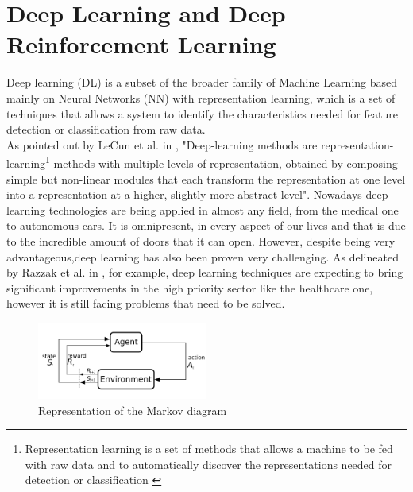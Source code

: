 \documentclass[conference]{IEEEtran}
\begin{document}
\section{Deep Learning and Deep Reinforcement Learning}\label{Deep_learning_DRL}
Deep learning (DL) is a subset of the broader family of Machine Learning based mainly on Neural Networks (NN)  with representation learning, which is a set of techniques that allows a system to identify the characteristics needed for feature detection or classification from raw data. \\
As pointed out by LeCun et al. in \cite{deep_learning}, "Deep-learning methods are representation-learning\footnote{Representation learning is a set of methods that allows a machine to be fed with raw data and to automatically discover the representations needed for detection or classification \cite{deep_learning}} methods with multiple levels of representation, obtained by composing simple but non-linear modules that each transform the representation at one level into a representation at a higher, slightly more abstract level". 
Nowadays deep learning technologies are being applied in almost any field, from the medical one to autonomous cars. It is omnipresent, in every aspect of our lives and that is due to the incredible amount of doors that it can open. 
However, despite being very advantageous,deep learning has also been proven very challenging. 
As delineated by Razzak et al. in \cite{Razzak2018}, for example, deep learning techniques are expecting to bring significant improvements in the high priority sector like the healthcare one, however it is still facing problems that need to be solved. 
\begin{figure}[htb]
    \centering
    \includegraphics[width=0.5\textwidth]{img/markov_dia.png}
    \caption[Ciao]{Representation of the Markov diagram \cite{enwiki:1060247210}
    }
    \label{fig:m_dia}
\end{figure}
\end{document}
